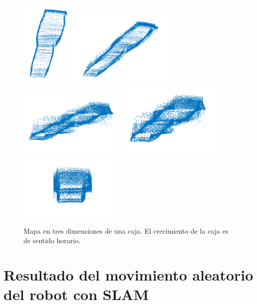 \begin{figure}
  \centering \footnotesize
  \includegraphics[width=0.22\textwidth]{images/3DMOV_2.png}
  \includegraphics[width=0.45\textwidth]{images/3DMOV_3.png}
  \includegraphics[width=0.45\textwidth]{images/3DMOV_6.png}
  \includegraphics[width=0.45\textwidth]{images/3DMOV_7.png}
  \includegraphics[width=0.45\textwidth]{images/3DMOV_8.png}
  \captionsetup{font=footnotesize}
  \caption{Mapa en tres dimensiones de una caja. El crecimiento de la caja es de sentido horario.}
  \label{fig:Caja3D}
\end{figure}

\section{Resultado del movimiento aleatorio del robot con SLAM}
